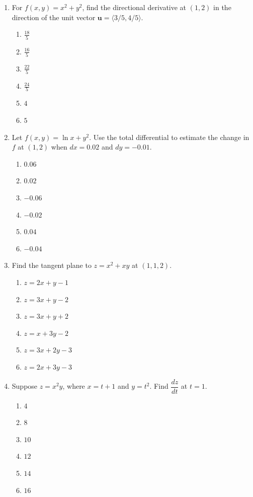 \documentclass[a4paper,12pt]{article}
\theoremstyle{mystyle}
\numberwithin{equation}{section}
\numberwithin{theorem}{section}
\numberwithin{proposition}{section}
\numberwithin{example}{section}
\numberwithin{remark}{section}
\numberwithin{lemma}{section}
\numberwithin{corollary}{section}
\numberwithin{definition}{section}
\begin{document}
\begin{enumerate}[label=\textbf{Question \arabic*.}, leftmargin=*]
\item For \(f(x,y)=x^{2}+y^{2}\), find the directional derivative at
\((1,2)\) in the direction of the unit vector
\(\mathbf{u}=\langle 3/5,4/5\rangle\).
\begin{enumerate}[label=(\Alph*)]
\item \(\frac{18}{5}\)
\item \(\frac{16}{5}\)
\item \(\frac{22}{5}\)
\item \(\frac{24}{5}\)
\item \(4\)
\item \(5\)
\end{enumerate}

\item Let \(f(x,y)=\ln x+y^{2}\). Use the total differential to estimate
the change in \(f\) at \((1,2)\) when \(dx=0.02\) and \(dy=-0.01\).
\begin{enumerate}[label=(\Alph*)]
\item \(0.06\)
\item \(0.02\)
\item \(-0.06\)
\item \(-0.02\)
\item \(0.04\)
\item \(-0.04\)
\end{enumerate}

\item Find the tangent plane to \(z=x^{2}+xy\) at \((1,1,2)\).
\begin{enumerate}[label=(\Alph*)]
\item \(z=2x+y-1\)
\item \(z=3x+y-2\)
\item \(z=3x+y+2\)
\item \(z=x+3y-2\)
\item \(z=3x+2y-3\)
\item \(z=2x+3y-3\)
\end{enumerate}

\item Suppose \(z=x^{2}y\), where \(x=t+1\) and \(y=t^{2}\).
Find \(\dfrac{dz}{dt}\) at \(t=1\).
\begin{enumerate}[label=(\Alph*)]
\item \(4\)
\item \(8\)
\item \(10\)
\item \(12\)
\item \(14\)
\item \(16\)
\end{enumerate}


\end{enumerate}
\end{document}
